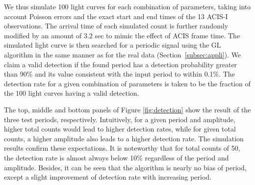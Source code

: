 \documentclass[fleqn,usenatbib]{mnras}
\begin{document}
We thus simulate 100 light curves for each combination of parameters, taking into account Poisson errors and the exact start and end times of the 13 ACIS-I observations. 
 The arrival time of each simulated count is further randomly modified by an amount of 3.2 sec to mimic the effect of ACIS frame time.
The simulated light curve is then searched for a periodic signal using the GL algorithm in the same manner as for the real data (Section~\ref{subsec:appli}).
We claim a valid detection if the found period has a detection probability greater than 90\% and its value consistent with the input period to within 0.1\%. 
The detection rate for a given combination of parameters is taken to be the fraction of the 100 light curves having a valid detection.

The top, middle and bottom panels of Figure \ref{fig:detection} show the result of the three test periods, respectively. 
Intuitively, for a given period and amplitude, higher total counts would lead to higher detection rates, while for given total counts, a higher amplitude also leads to a higher detection rate. The simulation results confirm these expectations.  
It is noteworthy that for total counts of 50, the detection rate is almost always below 10\% regardless of the period and amplitude. 
Besides, it can be seen that the algorithm is nearly no bias of period, except a slight improvement of detection rate with increasing period.
 
\end{document}
